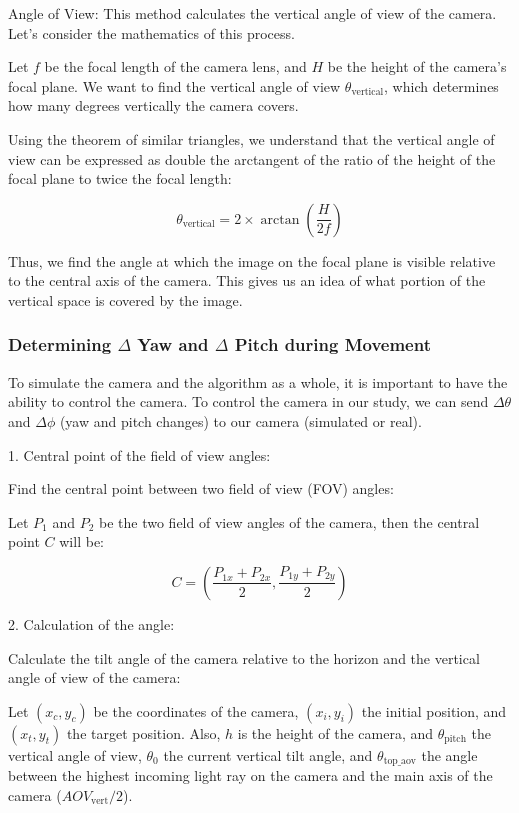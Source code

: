 Angle of View: 
This method calculates the vertical angle of view of the camera. Let's consider the mathematics of this process.

Let $f$ be the focal length of the camera lens, and $H$ be the height of the camera's focal plane. We want to find the vertical angle of view $\theta_{\text{vertical}}$, which determines how many degrees vertically the camera covers.

Using the theorem of similar triangles, we understand that the vertical angle of view can be expressed as double the arctangent of the ratio of the height of the focal plane to twice the focal length:

$$
\theta_{\text{vertical}} = 2 \times \arctan \left( \frac{H}{2f} \right)
$$

Thus, we find the angle at which the image on the focal plane is visible relative to the central axis of the camera. This gives us an idea of what portion of the vertical space is covered by the image.

\subsubsection{Determining $\Delta$ Yaw and $\Delta$ Pitch during Movement}
To simulate the camera and the algorithm as a whole, it is important to have the ability to control the camera.
To control the camera in our study, we can send $\Delta \theta$ and $\Delta \phi$ (yaw and pitch changes) to our camera (simulated or real).

1. Central point of the field of view angles:

   Find the central point between two field of view (FOV) angles:

   Let $ P_1  $ and  $ P_2  $ be the two field of view angles of the camera, then the central point $ C  $ will be:

    $$
   C = \left( \frac{P_{1x} + P_{2x}}{2}, \frac{P_{1y} + P_{2y}}{2} \right)
    $$

2. Calculation of the angle:

   Calculate the tilt angle of the camera relative to the horizon and the vertical angle of view of the camera:

   Let $ (x_c, y_c)  $ be the coordinates of the camera, $ (x_i, y_i)  $ the initial position, and $ (x_t, y_t)  $ the target position. Also, $ h  $ is the height of the camera, and $ \theta_{\text{pitch}}  $ the vertical angle of view, $\theta_0$ the current vertical tilt angle, and $\theta_{\text{top\_aov}}$ the angle between the highest incoming light ray on the camera and the main axis of the camera ($AOV_{\text{vert}}/2$).

